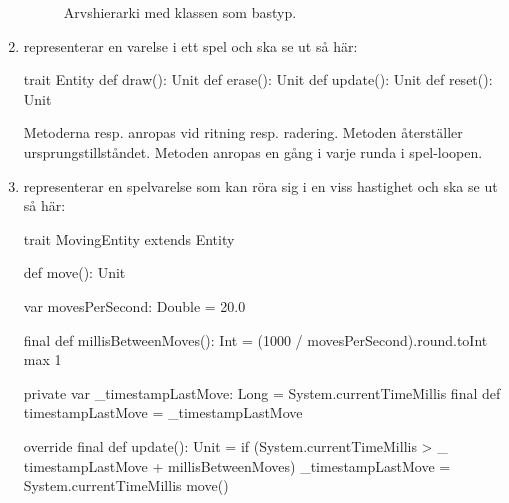 \begin{enumerate}[label={$\square$}, leftmargin=*]
\begin{figure}[H]
\begin{center}
\end{center}
\caption{Arvshierarki med klassen  som bastyp.}
\label{snake:fig:entity-hierarchy}
\end{figure}


\item {} representerar en varelse i ett spel och ska se ut så här:
\begin{Code}
trait Entity {
  def draw():   Unit
  def erase():  Unit
  def update(): Unit
  def reset():  Unit
}
\end{Code}
Metoderna  resp.  anropas vid ritning resp. radering. Metoden  återställer ursprungstillståndet. Metoden  anropas en gång i varje runda i spel-loopen.

\item {} representerar en spelvarelse som kan röra sig i en viss hastighet och ska se ut så här:
\begin{Code}
trait MovingEntity extends Entity {
  def move(): Unit

  var movesPerSecond: Double = 20.0

  final def millisBetweenMoves(): Int =
    (1000 / movesPerSecond).round.toInt max 1

  private var _timestampLastMove: Long = System.currentTimeMillis
  final def timestampLastMove = _timestampLastMove

  override final def update(): Unit =
    if (System.currentTimeMillis > _
          timestampLastMove + millisBetweenMoves) {
      _timestampLastMove = System.currentTimeMillis
      move()
    }
}
\end{Code}


\end{enumerate}
